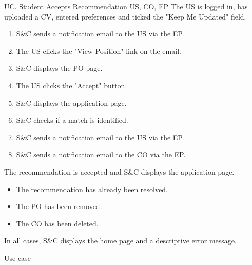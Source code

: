 \clearpage
\begin{usecase}
    {UC\theuc. Student Accepts Recommendation}
    {US, CO, EP}
    {The US is logged in, has uploaded a CV, entered preferences and ticked the "Keep Me Updated" field.}
    {\begin{enumerate}[leftmargin=*]
        \item S\&C sends a notification email to the US via the EP.
        \item The US clicks the "View Position" link on the email.
        \item S\&C displays the PO page.
        \item The US clicks the "Accept" button.
        \item S\&C displays the application page.
        \item S\&C checks if a match is identified.
        \item S\&C sends a notification email to the US via the EP.
        \item S\&C sends a notification email to the CO via the EP.
    \end{enumerate}}
    {The recommendation is accepted and S\&C displays the application page.}
    {\begin{itemize}[leftmargin=*, label=\tiny\textbullet]
        \item The recommendation has already been resolved.
        \item The PO has been removed.
        \item The CO has been deleted.
    \end{itemize}
    In all cases, S\&C displays the home page and a descriptive error message.}
    {Use case \theuc}
\end{usecase}

